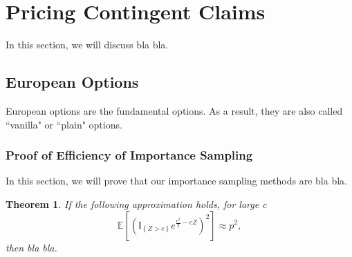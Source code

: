 \documentclass[12pt]{article}  %
\numberwithin{equation}{subsection}
\newtheorem{thm}{Theorem}[section]  %
\theoremstyle{plain}
\begin{document}
\section{Pricing Contingent Claims}
In this section, we will discuss bla bla.

\subsection{European Options}
European options are the fundamental options. As a result, they are also called ``vanilla" or ``plain" options.

\subsubsection{Proof of Efficiency of Importance Sampling}
In this section, we will prove that our importance sampling methods are bla bla.

\begin{thm}  %
If the following approximation holds, for large c
\[
\mathbb{E}\left[ \left( \mathbb{I}_{\left\lbrace Z>c\right\rbrace }e^{\frac{c^2}{2}-cZ}\right) ^2\right] \approx p^2,
\]
then bla bla.
\end{thm}
\end{document}
